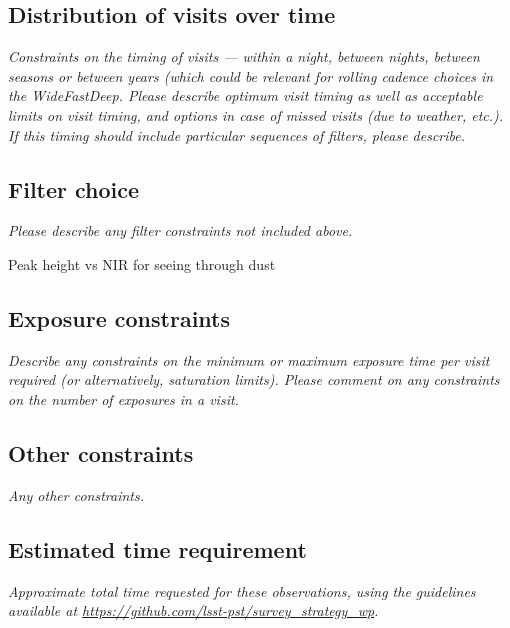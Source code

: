 \documentclass[11pt]{article}
\begin{document}
\subsection{Distribution of visits over time}
\begin{footnotesize}{\it Constraints on the timing of visits --- within a night, between nights, between seasons or
between years (which could be relevant for rolling cadence choices in the WideFastDeep. 
Please describe optimum visit timing as well as acceptable limits on visit timing, and options in
case of missed visits (due to weather, etc.). If this timing should include particular sequences
of filters, please describe.}
\end{footnotesize}

\subsection{Filter choice}
\begin{footnotesize}
{\it Please describe any filter constraints not included above.}
\end{footnotesize}

Peak height vs NIR for seeing through dust

\subsection{Exposure constraints}
\begin{footnotesize}
{\it Describe any constraints on the minimum or maximum exposure time per visit required (or alternatively, saturation limits).
Please comment on any constraints on the number of exposures in a visit.}
\end{footnotesize}

\subsection{Other constraints}
\begin{footnotesize}
{\it Any other constraints.}
\end{footnotesize}

\subsection{Estimated time requirement}
\begin{footnotesize}
{\it Approximate total time requested for these observations, using the guidelines available at \url{https://github.com/lsst-pst/survey_strategy_wp}.}
\end{footnotesize}
\end{document}
